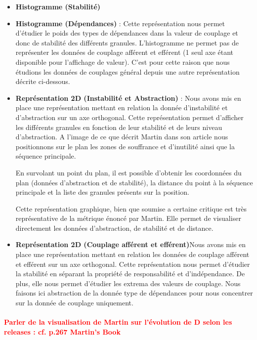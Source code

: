 \documentclass{scrartcl}
\newcommand{\TODO}[1] {
    \noindent \paragraph{\textcolor{red}{#1}}
}
\begin{document}
        \begin{itemize}
        \item \textbf{Histogramme (Stabilité)}
        \item \textbf{Histogramme (Dépendances)} : Cette représentation nous permet d'étudier le poids des types de dépendances dans la valeur de couplage et donc de stabilité des différents granules. L'histogramme ne permet pas de représenter les données de couplage afférent et efférent (1 seul axe étant disponible pour l'affichage de valeur). C'est pour cette raison que nous étudions les données de couplages général depuis une autre représentation décrite ci-dessous.

        \item \textbf{Représentation 2D (Instabilité et Abstraction)} : Nous avons mis en place une représentation mettant en relation la donnée d'instabilité et d'abstraction sur un axe orthogonal. Cette représentation permet d'afficher les différents granules en fonction de leur stabilité et de leurs niveau d'abstraction. 
        A l'image de ce que décrit Martin dans son article nous positionnons sur le plan les zones de souffrance et d'inutilité ainsi que la séquence principale. 
        
        En survolant un point du plan, il est possible d'obtenir les coordonnées du plan (données d'abstraction et de stabilité), la distance du point à la séquence principale et la liste des granules présents sur la position.
        
        Cette représentation graphique, bien que soumise a certaine critique est très représentative de la métrique énoncé par Martin. Elle permet de visualiser directement les données d'abstraction, de stabilité et de distance.

        \item \textbf{Représentation 2D (Couplage afférent et efférent)}Nous avons mis en place une représentation mettant en relation les données de couplage afférent et efférent sur un axe orthogonal. Cette représentation nous permet d'étudier la stabilité en séparant la propriété de responsabilité et d'indépendance. De plus, elle nous permet d'étudier les extrema des valeurs de couplage. Nous faisons ici abstraction de la donnée type de dépendances pour nous concentrer sur la donnée de couplage uniquement.
    \end{itemize}
    
    
    \TODO{Parler de la visualisation de Martin sur l'évolution de D selon les releases : cf. p.267 Martin's Book}
\end{document}
